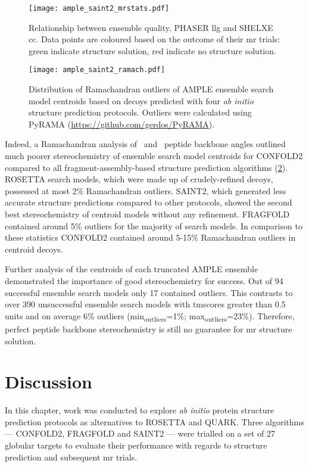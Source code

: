 \begin{figure}[H]
    \centering
    \texttt{[image: ample\_saint2\_mrstats.pdf]}
    \caption[Relationship between ensemble metrics]{Relationship between ensemble quality, PHASER \gls{llg} and SHELXE \gls{cc}. Data points are coloured based on the outcome of their \gls{mr} trials: green indicate structure solution, red indicate no structure solution.}
    \label{fig:ample_saint2_mrstats}
\end{figure}

\begin{figure}[H]
    \centering
    \texttt{[image: ample\_saint2\_ramach.pdf]}
    \caption[Ramachandran outliers of ensemble search model centroids]{Distribution of Ramachandran outliers of AMPLE ensemble search model centroids based on decoys predicted with four \textit{ab initio} structure prediction protocols. Outliers were calculated using PyRAMA (\href{https://github.com/gerdos/PyRAMA}{https://github.com/gerdos/PyRAMA}).}
    \label{fig:ample_saint2_ramach}
\end{figure}

Indeed, a Ramachandran analysis of \textphi\ and \textpsi\ peptide backbone angles outlined much poorer stereochemistry of ensemble search model centroids for CONFOLD2 compared to all fragment-assembly-based structure prediction algorithms (\cref{fig:ample_saint2_ramach}). ROSETTA search models, which were made up of crudely-refined decoys, possessed at most 2\% Ramachandran outliers. SAINT2, which generated less accurate structure predictions compared to other protocols, showed the second best stereochemistry of centroid models without any refinement.  FRAGFOLD contained around 5\% outliers for the majority of search models. In comparison to these statistics CONFOLD2 contained around 5-15\% Ramachandran outliers in centroid decoys. 

Further analysis of the centroids of each truncated AMPLE ensemble demonstrated the importance of good stereochemistry for success. Out of 94 successful ensemble search models only 17 contained outliers. This contrasts to over 390 unsuccessful ensemble search models with \gls{tmscore}s greater than 0.5 units and on average 6\% outliers (min\textsubscript{outliers}=1\%; max\textsubscript{outliers}=23\%). Therefore, perfect peptide backbone stereochemistry is still no guarantee for \gls{mr} structure solution. 

\section{Discussion}
In this chapter, work was conducted to explore \textit{ab initio} protein structure prediction protocols as alternatives to ROSETTA and QUARK. Three algorithms --- CONFOLD2, FRAGFOLD and SAINT2 --- were trialled on a set of 27 globular targets to evaluate their performance with regards to structure prediction and subsequent \gls{mr} trials.

